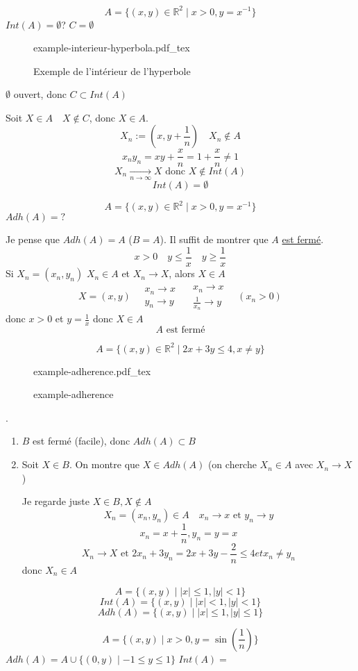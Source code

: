 \documentclass[a4paper]{report}
\newcommand\R{\ensuremath{\mathbb{R}}}
\renewcommand\O{\ensuremath{\emptyset}}
\theoremstyle{definition}
\newcommand{\incfig}[1]{%
    \def\svgwidth{\columnwidth}
    {#1.pdf_tex}
}
\begin{document}
\begin{eg}
   \[
       A = \{(x, y) \in \R^2 \mid x > 0, y = x^{-1}\}
   \]  
   $Int(A) = \O$? $C = \O$
\begin{figure}[H]
    \centering
    \incfig{example-interieur-hyperbola}
    \caption{Exemple de l'intérieur de l'hyperbole}
    \label{fig:example-interieur-hyperbola}
\end{figure}
$\O$ ouvert, donc $C \subset Int(A)$
\par
Soit $X \in A \quad X \not\in C$, donc $X \in A$.
 \[
X_n := (x, y + \frac{1}{n}) \quad X_n \not\in A
\] 
\[
x_ny_n = xy + \frac{x}{n} = 1 + \frac{x}{n} \neq 1
\] 
\[
X_n \xrightarrow[n \to \infty]{} X \text{ donc } X \not\in Int(A)
\] 
\[
Int(A) = \O
\] 
\end{eg}
\begin{eg}
   \[
       A = \{(x, y) \in \R^2 \mid x > 0, y = x^{-1}\}
   \]  
   $Adh(A) = ?$
   \par
   Je pense que  $Adh(A) = A$ ($B = A$). Il suffit de montrer que $A$ \underline{est fermé}.
    \[
   x > 0 \quad y \le \frac{1}{x} \quad y \ge \frac{1}{x}
   \] 
   Si $X_n = (x_n, y_n)$  \quad $X_n \in A$ et  $X_n \to X$, alors $X \in A$
    \[
        X = (x, y) \quad \substack{x_n \to x \\ y_n \to y} \quad \substack{x_n \to x \\ \frac{1}{x_n} \to y} \quad (x_n > 0)
   \] 
   donc $x > 0$ et  $y = \frac{1}{x}$ donc $X \in A$
    \[
   A \text{ est fermé}
   \] 
\end{eg}
\begin{eg}
   \[
       A = \{(x, y) \in \R^2 \mid 2x + 3y \le 4, x \neq y\}
   \]  
\begin{figure}[H]
    \centering
    \incfig{example-adherence}
    \caption{example-adherence}
    \label{fig:example-adherence}
\end{figure}
.
\begin{enumerate}
    \item 
        $B$ est fermé (facile), donc  $Adh(A) \subset B$
    \item Soit $X \in B$. On montre que  $X \in Adh(A)$ (on cherche $X_n \in A$ avec  $X_n \to X$) 
        \par
        Je regarde juste $X \in B, X \not\in A$
        \[
        X_n = (x_n, y_n) \in A \quad x_n \to x \text{ et } y_n \to y
        \] 
        \[
        x_n = x + \frac{1}{n}, y_n = y = x
        \] 
        \[
        X_n \to X \text{ et } 2x_n + 3y_n = 2x + 3y - \frac{2}{n} \le 4 et x_n \neq y_n 
        \] 
        donc $X_n \in A$
\end{enumerate}
\end{eg}
\begin{eg}
   \[
       A = \{(x, y) \mid |x| \le 1, |y| < 1\}
   \]  
   \[
       Int(A) = \{(x, y) \mid |x| < 1, |y| < 1 \}
   \] 
   \[
       Adh(A) = \{(x, y) \mid |x| \le 1, |y| \le 1\}
   \] 
\end{eg}
\begin{eg}
   \[
       A = \{(x,y) \mid x > 0, y = \sin(\frac{1}{n}) \}
   \]  
   $Adh(A) = A \cup \{(0, y) \mid -1 \le y \le 1\}$
   $Int(A) = $
\end{eg}
\end{document}
